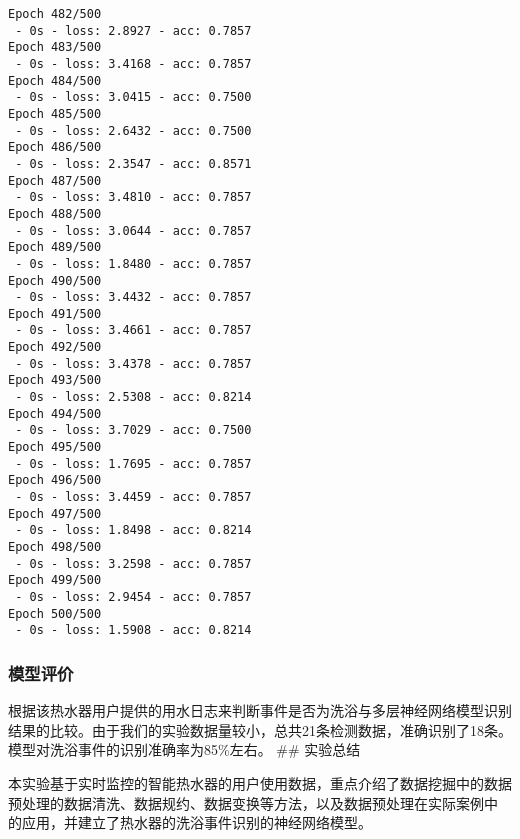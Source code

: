\documentclass[11pt]{article}
\begin{document}
\begin{Verbatim}[commandchars=\\\{\}]
Epoch 482/500
 - 0s - loss: 2.8927 - acc: 0.7857
Epoch 483/500
 - 0s - loss: 3.4168 - acc: 0.7857
Epoch 484/500
 - 0s - loss: 3.0415 - acc: 0.7500
Epoch 485/500
 - 0s - loss: 2.6432 - acc: 0.7500
Epoch 486/500
 - 0s - loss: 2.3547 - acc: 0.8571
Epoch 487/500
 - 0s - loss: 3.4810 - acc: 0.7857
Epoch 488/500
 - 0s - loss: 3.0644 - acc: 0.7857
Epoch 489/500
 - 0s - loss: 1.8480 - acc: 0.7857
Epoch 490/500
 - 0s - loss: 3.4432 - acc: 0.7857
Epoch 491/500
 - 0s - loss: 3.4661 - acc: 0.7857
Epoch 492/500
 - 0s - loss: 3.4378 - acc: 0.7857
Epoch 493/500
 - 0s - loss: 2.5308 - acc: 0.8214
Epoch 494/500
 - 0s - loss: 3.7029 - acc: 0.7500
Epoch 495/500
 - 0s - loss: 1.7695 - acc: 0.7857
Epoch 496/500
 - 0s - loss: 3.4459 - acc: 0.7857
Epoch 497/500
 - 0s - loss: 1.8498 - acc: 0.8214
Epoch 498/500
 - 0s - loss: 3.2598 - acc: 0.7857
Epoch 499/500
 - 0s - loss: 2.9454 - acc: 0.7857
Epoch 500/500
 - 0s - loss: 1.5908 - acc: 0.8214

    \end{Verbatim}

    \subsubsection{模型评价}\label{ux6a21ux578bux8bc4ux4ef7}

根据该热水器用户提供的用水日志来判断事件是否为洗浴与多层神经网络模型识别结果的比较。由于我们的实验数据量较小，总共21条检测数据，准确识别了18条。模型对洗浴事件的识别准确率为85\%左右。
\#\# 实验总结

本实验基于实时监控的智能热水器的用户使用数据，重点介绍了数据挖掘中的数据预处理的数据清洗、数据规约、数据变换等方法，以及数据预处理在实际案例中
的应用，并建立了热水器的洗浴事件识别的神经网络模型。


    
    
    
    
\end{document}
